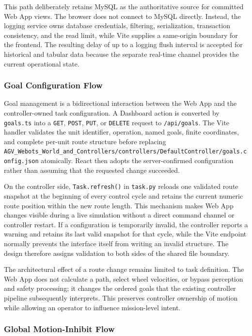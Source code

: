 This path deliberately retains MySQL as the authoritative source for committed Web App views. The browser does not connect to MySQL directly. Instead, the logging service owns database credentials, filtering, serialization, transaction consistency, and the read limit, while Vite supplies a same-origin boundary for the frontend. The resulting delay of up to a logging flush interval is accepted for historical and tabular data because the separate real-time channel provides the current operational state.

\subsubsection{Goal Configuration Flow}

Goal management is a bidirectional interaction between the Web App and the controller-owned task configuration. A Dashboard action is converted by \texttt{goals.ts} into a \texttt{GET}, \texttt{POST}, \texttt{PUT}, or \texttt{DELETE} request to \texttt{/api/goals}. The Vite handler validates the unit identifier, operation, named goals, finite coordinates, and complete per-unit route structure before replacing \texttt{AGV\_Webots\_World\_and\_Controllers/controllers/DefaultController/goals.config.json} atomically. React then adopts the server-confirmed configuration rather than assuming that the requested change succeeded.

On the controller side, \texttt{Task.refresh()} in \texttt{task.py} reloads one validated route snapshot at the beginning of every control cycle and retains the current numeric route position within the new route length. This mechanism makes Web App changes visible during a live simulation without a direct command channel or controller restart. If a configuration is temporarily invalid, the controller reports a warning and retains its last valid snapshot for that cycle, while the Vite endpoint normally prevents the interface itself from writing an invalid structure. The design therefore assigns validation to both sides of the shared file boundary.

The architectural effect of a route change remains limited to task definition. The Web App does not calculate a path, select wheel velocities, or bypass perception and safety processing; it changes the ordered goals that the existing controller pipeline subsequently interprets. This preserves controller ownership of motion while allowing an operator to influence mission-level intent.

\subsubsection{Global Motion-Inhibit Flow}

